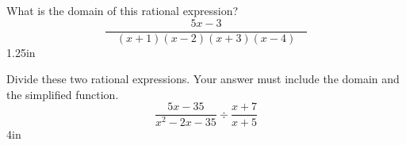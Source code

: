\documentclass[12pt,letterpaper]{memoir}
\begin{document}
\pagestyle{empty}
\checkandfixthelayout
\raggedbottom


\Large

\vspace{-1.5\onelineskip}
\myWideProblem
{
    \Large
    What is the domain of this rational expression?
    \[
        \frac
        {5x-3}
        {\quad(x+1)(x-2)(x+3)(x-4)\quad}
    \]
}
{1.25in}

\myWideProblem
{
    \Large
    Divide these two rational expressions.
    Your answer must include the domain and the simplified function.
    \[
        \frac
        {5x-35}
        {x^2 - 2x - 35}
        \div 
        \frac 
        {x+7}
        {x+5}
    \]
}
{4in}
\end{document}
